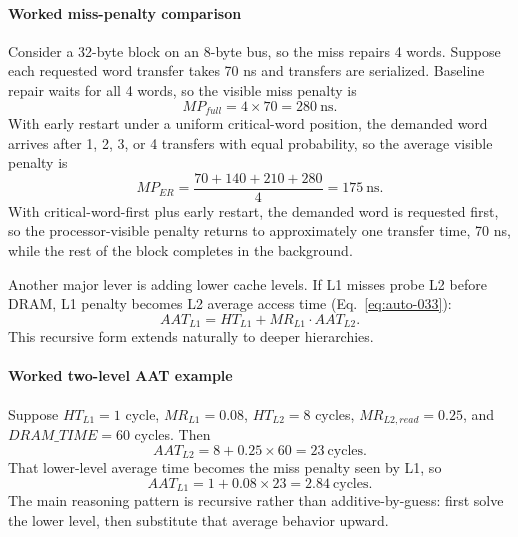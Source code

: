 \paragraph{Worked miss-penalty comparison}\label{par:auto-021aa}
Consider a 32-byte block on an 8-byte bus, so the miss repairs 4 words.
Suppose each requested word transfer takes 70 ns and transfers are serialized.
Baseline repair waits for all 4 words, so the visible miss penalty is
\begin{equation}\label{eq:auto-032b}
    MP_{full}=4\times 70 = 280\ \text{ns}.
\end{equation}
With early restart under a uniform critical-word position, the demanded word arrives after 1, 2, 3, or 4 transfers with equal probability, so the average visible penalty is
\begin{equation}\label{eq:auto-032c}
    MP_{ER}=\frac{70+140+210+280}{4}=175\ \text{ns}.
\end{equation}
With critical-word-first plus early restart, the demanded word is requested first, so the processor-visible penalty returns to approximately one transfer time, 70 ns, while the rest of the block completes in the background.

Another major lever is adding lower cache levels.
If L1 misses probe L2 before DRAM, L1 penalty becomes L2 average access time (Eq.~\eqref{eq:auto-033}):
\begin{equation}\label{eq:auto-033}
    AAT_{L1} = HT_{L1} + MR_{L1}\cdot AAT_{L2}.
\end{equation}
This recursive form extends naturally to deeper hierarchies.

\paragraph{Worked two-level AAT example}\label{par:auto-021ac}
Suppose $HT_{L1}=1$ cycle, $MR_{L1}=0.08$, $HT_{L2}=8$ cycles, $MR_{L2,read}=0.25$, and $DRAM\_TIME=60$ cycles.
Then
\begin{equation}\label{eq:auto-033a}
    AAT_{L2}=8+0.25\times 60=23\ \text{cycles}.
\end{equation}
That lower-level average time becomes the miss penalty seen by L1, so
\begin{equation}\label{eq:auto-033b}
    AAT_{L1}=1+0.08\times 23=2.84\ \text{cycles}.
\end{equation}
The main reasoning pattern is recursive rather than additive-by-guess: first solve the lower level, then substitute that average behavior upward.

